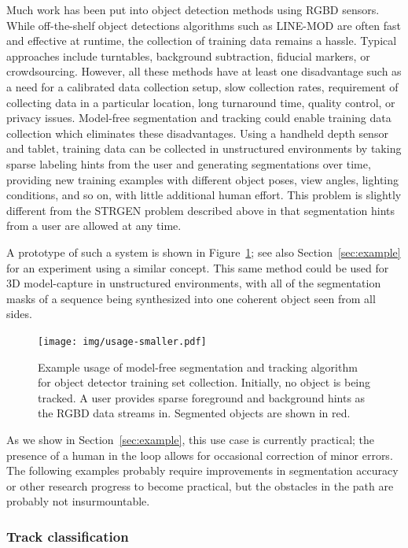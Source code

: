 \documentclass[graybox]{svmult}
\begin{document}
Much work has been put into object detection methods using RGBD sensors.  While off-the-shelf object detections algorithms such as LINE-MOD \cite{hinterstoisser2011a} are often fast and effective at runtime, the collection of training data remains a hassle.  Typical approaches include turntables, background subtraction, fiducial markers, or crowdsourcing.  However, all these methods have at least one disadvantage such as a need for a calibrated data collection setup, slow collection rates, requirement of collecting data in a particular location, long turnaround time, quality control, or privacy issues.  Model-free segmentation and tracking could enable training data collection which eliminates these disadvantages.  Using a handheld depth sensor and tablet, training data can be collected in unstructured environments by taking sparse labeling hints from the user and generating segmentations over time, providing new training examples with different object poses, view angles, lighting conditions, and so on, with little additional human effort.  This problem is slightly different from the STRGEN problem described above in that segmentation hints from a user are allowed at any time.

A prototype of such a system is shown in Figure~\ref{fig:usage}; see also Section~\ref{sec:example} for an experiment using a similar concept.  This same method could be used for 3D model-capture in unstructured environments, with all of the segmentation masks of a sequence being synthesized into one coherent object seen from all sides.

\begin{figure}
  \centering
  \texttt{[image: img/usage-smaller.pdf]}
  \caption{Example usage of model-free segmentation and tracking algorithm for object detector training set collection.  Initially, no object is being tracked.  A user provides sparse foreground and background hints as the RGBD data streams in.  Segmented objects are shown in red. }
  \label{fig:usage}
\end{figure}

As we show in Section~\ref{sec:example}, this use case is currently practical; the presence of a human in the loop allows for occasional correction of minor errors.  The following examples probably require improvements in segmentation accuracy or other research progress to become practical, but the obstacles in the path are probably not insurmountable.

\subsubsection{Track classification}
\end{document}

